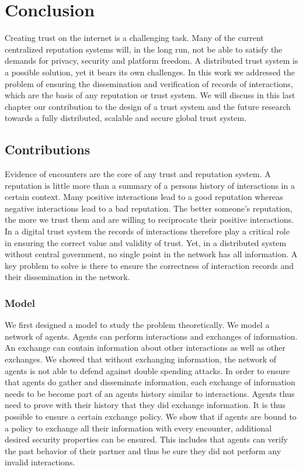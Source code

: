 \chapter{Conclusion}
Creating trust on the internet is a challenging task.
Many of the current centralized reputation systems will, in the long run, not be able
to satisfy the demands for privacy, security and platform freedom. A distributed trust system is 
a possible solution, yet it bears its own challenges. In this work we addressed the problem of ensuring
the dissemination and verification of records of interactions, which are the basis of any reputation or trust 
system. We will discuss in this last chapter our contribution to the design of a trust system and 
the future research towards a fully distributed, scalable and secure global trust system.

\section{Contributions}
Evidence of encounters are the core of any trust and reputation system. A reputation is little more
than a summary of a persons history of interactions in a certain context. Many positive interactions
lead to a good reputation whereas negative interactions lead to a bad reputation. The better someone's
reputation, the more we trust them and are willing to reciprocate their positive interactions. In a 
digital trust system the records of interactions therefore play a critical role in ensuring the 
correct value and validity of trust. Yet, in a distributed system without central government, no 
single point in the network has all information. A key problem to solve is there to ensure the 
correctness of interaction records and their dissemination in the network.

\subsection{Model}
We first designed a model to study the problem theoretically. We model a network of agents. Agents 
can perform interactions and exchanges of information. An exchange can contain information about 
other interactions as well as other exchanges. We showed that without 
exchanging information, the network of agents is not able to defend against double spending attacks. In order to 
ensure that agents do gather and disseminate information, each exchange of information needs to be become part of an agents history
similar to interactions. Agents thus need to prove 
with their history that they did exchange information. It is thus possible to ensure a certain exchange
policy. We show that if agents are bound to a policy to exchange all their 
information with every encounter, additional desired security properties can be ensured. This includes
that agents can verify the past behavior of their partner and thus be sure they did not perform any 
invalid interactions. 

